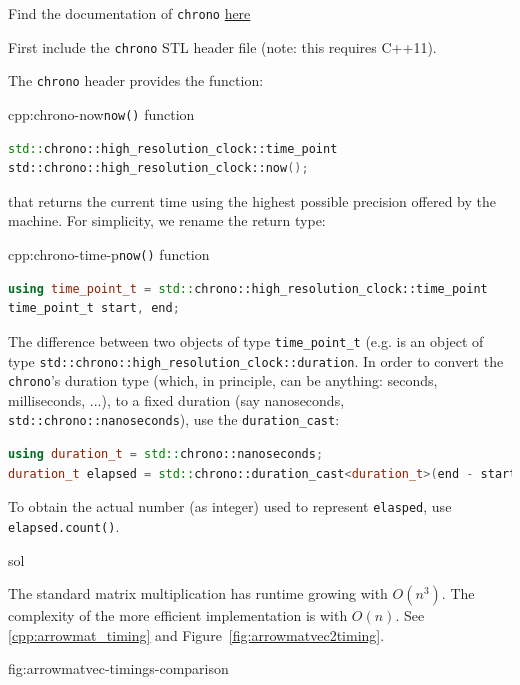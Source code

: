 \begin{samproblem}
\begin{subproblem}{}
  Find the documentation of \texttt{chrono} \href{http://en.cppreference.com/w/cpp/chrono/high_resolution_clock}{here}

  First include the \texttt{chrono} STL header file (note: this requires C++11).

  The \texttt{chrono} header provides the function:
\begin{samcode}[C++11-code]{cpp:chrono-now}{\texttt{now()} function}
\begin{lstlisting}[language=C++, style=cpp]
std::chrono::high_resolution_clock::time_point
std::chrono::high_resolution_clock::now();
\end{lstlisting}
\end{samcode}
that returns the current time using the highest possible precision offered by
the machine. For simplicity, we rename the return type:
\begin{samcode}[C++11-code]{cpp:chrono-time-p}{\texttt{now()} function}
\begin{lstlisting}[language=C++, style=cpp]
using time_point_t = std::chrono::high_resolution_clock::time_point
time_point_t start, end;
\end{lstlisting}
\end{samcode}
The difference between two objects of type \texttt{time\_point\_t}
(e.g.  is an
object of type \texttt{std::chrono::high\_resolution\_clock::duration}.
In order to convert the \texttt{chrono}'s duration type (which, in principle,
can be anything: seconds, milliseconds, ...), to a fixed duration (say
nanoseconds, \texttt{std::chrono::nanoseconds}), use the \texttt{duration\_cast}:
\begin{lstlisting}[language=C++, style=cpp]
using duration_t = std::chrono::nanoseconds;
duration_t elapsed = std::chrono::duration_cast<duration_t>(end - start);
\end{lstlisting}
To obtain the actual number (as integer) used to represent \texttt{elasped}, use \texttt{elapsed.count()}.


 \begin{samwriteprbpart}{sol}
\begin{samsolution}
The standard matrix multiplication has runtime growing with $O(n^3)$.
The complexity of the more efficient implementation is with $O(n)$.
See \autoref{cpp:arrowmat_timing} and Figure~\ref{fig:arrowmatvec2timing}.


{fig:arrowmatvec-timings-comparison}

\end{samsolution}
\end{samwriteprbpart}
\end{subproblem}

\end{samproblem}

